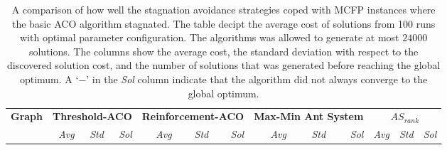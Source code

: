 \begin{sidewaystable}[p]
\begin{tabular}{lrrrrrrrrrrrr}
  \bottomrule
  \end{tabular}
\end{sidewaystable}

\begin{sidewaystable}[p]
   \tiny
   \caption[Stagnation avoidance efficiency]{A comparison of how well the stagnation avoidance strategies coped with MCFP instances where the basic ACO algorithm stagnated. The table decipt the average cost of solutions from 100 runs with optimal parameter configuration. The algorithms was allowed to generate at most $24000$ solutions. The columns show the average cost, the standard deviation with respect to the discovered solution cost, and the number of solutions that was generated before reaching the global optimum. A `$-$' in the \emph{Sol} column indicate that the algorithm did not always converge to the global optimum.}
   \centering
   
   \begin{tabular}{lrrrrrrrrrrrr}
   \toprule
   
  \textbf{Graph} & \multicolumn{3}{c}{\textbf{Threshold\@{-}ACO}} & \multicolumn{3}{c}{\textbf{Reinforcement\@{-}ACO}} & \multicolumn{3}{c}{\textbf{Max\@{-}Min Ant System}} & \multicolumn{3}{c}{\textbf{$AS_{rank}$}}\\
  \cmidrule(lr){2-4}
  \cmidrule(lr){5-7}
  \cmidrule(lr){8-10}
  \cmidrule(lr){11-13}
  & \emph{Avg} & \emph{Std} & \emph{Sol} & \emph{Avg} & \emph{Std} & \emph{Sol} & \emph{Avg} & \emph{Std} & \emph{Sol} & \emph{Avg} & \emph{Std} & \emph{Sol}\\
  \cmidrule(lr){2-2}
  \cmidrule(lr){3-3}
  \cmidrule(lr){4-4}
  \cmidrule(lr){5-5}
  \cmidrule(lr){6-6}
  \cmidrule(lr){7-7}
  \cmidrule(lr){8-8}
  \cmidrule(lr){9-9}
  \cmidrule(lr){10-10}
  \cmidrule(lr){11-11}
  \cmidrule(lr){12-12}
  \cmidrule(lr){13-13}
  

\end{tabular}
\end{sidewaystable}
